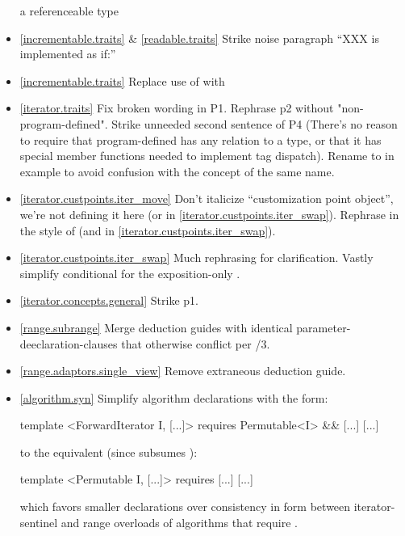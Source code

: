 \begin{itemize}
  a referenceable type
\item \ref{incrementable.traits} \& \ref{readable.traits} Strike noise paragraph
  ``XXX is implemented as if:''
\item \ref{incrementable.traits} Replace use of  with
\item \ref{iterator.traits} Fix broken wording in P1. Rephrase p2 without
  "non-program-defined". Strike unneeded second sentence of P4
  (There's no reason to require that program-defined 
  has any relation to a  type, or that it has special member
  functions needed to implement tag dispatch). Rename 
  to  in example to avoid confusion with the concept of the same name.
\item \ref{iterator.custpoints.iter_move} Don't italicize ``customization point
  object'', we're not defining it here
  (or in \ref{iterator.custpoints.iter_swap}). Rephrase in the style of
   (and in
  \ref{iterator.custpoints.iter_swap}).
\item \ref{iterator.custpoints.iter_swap} Much rephrasing for clarification.
  Vastly simplify conditional  for the exposition-only
  .
\item \ref{iterator.concepts.general} Strike p1.
\item \ref{range.subrange} Merge  deduction guides with identical
  parameter-deeclaration-clauses that otherwise conflict per
  /3.
\item \ref{range.adaptors.single_view} Remove extraneous 
  deduction guide.
\item \ref{algorithm.syn} Simplify algorithm declarations with the form:
\begin{codeblock}
template <ForwardIterator I, [...]>
  requires Permutable<I> && [...]
[...]
\end{codeblock}
to the equivalent (since  subsumes ):
\begin{codeblock}
template <Permutable I, [...]>
  requires [...]
[...]
\end{codeblock}
which favors smaller declarations over consistency in form between
iterator-sentinel and range overloads of algorithms that require
.
\end{itemize}

